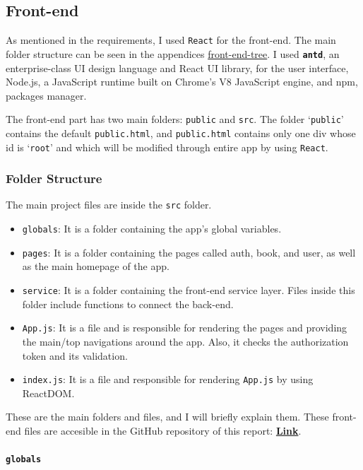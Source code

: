\subsection{Front-end}

As mentioned in the requirements, I used \texttt{React} for the front-end. The main folder structure can be seen in the appendices \hyperref[front-end-tree]{front-end-tree}. I used \textbf{\texttt{antd}}, an enterprise-class UI design language and React UI library, for the user interface, Node.js, a JavaScript runtime built on Chrome's V8 JavaScript engine, and npm, packages manager.

The front-end part has two main folders: \texttt{public} and \texttt{src}. The folder `\texttt{public}' contains the default \texttt{public.html}, and \texttt{public.html} contains only one div whose id is `\texttt{root}' and which will be modified through entire app by using \texttt{React}.
\newpage

\subsubsection{Folder Structure}

The main project files are inside the \texttt{src} folder.
\begin{itemize}
  \item \texttt{globals}: It is a folder containing the app's global variables.
  \item \texttt{pages}: It is a folder containing the pages called auth, book, and user, as well as the main homepage of the app.
  \item \texttt{service}: It is a folder containing the front-end service layer. Files inside this folder include functions to connect the back-end.
  \item \texttt{App.js}: It is a file and is responsible for rendering the pages and providing the main/top navigations around the app. Also, it checks the authorization token and its validation.
  \item \texttt{index.js}: It is a file and responsible for rendering \texttt{App.js} by using ReactDOM.
\end{itemize}
These are the main folders and files, and I will briefly explain them. These front-end files are accesible in the GitHub repository of this report: \href{https://github.com/burakmetehan/internship-report-2022}{\textbf{Link}}.

\paragraph{\texttt{globals}}

